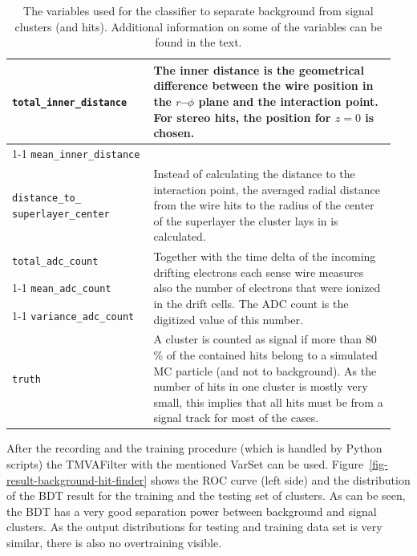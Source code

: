 \begin{table}
\begin{tabular}{p{0.35\linewidth}p{0.60\linewidth}}
   \verb+total_inner_distance+ & \multirow{3}{*}[-1.5pt]{\begin{minipage}{\linewidth} The inner distance is the geometrical difference between the wire position in the $r$--$\phi$ plane and the interaction point. For stereo hits, the position for $z = 0$ is chosen. \end{minipage}} \\[1ex] \cmidrule{1-1}
   \verb+mean_inner_distance+ & \\[1ex] \midrule
   \verb+distance_to_+ \verb+superlayer_center+ & Instead of calculating the distance to the interaction point, the averaged radial distance from the wire hits to the radius of the center of the superlayer the cluster lays in is calculated. \\ \midrule 
   
   \verb+total_adc_count+ & \multirow{3}{*}[-1pt]{\begin{minipage}{\linewidth} Together with the time delta of the incoming drifting electrons each sense wire measures also the number of electrons that were ionized in the drift cells. The ADC count is the digitized value of this number. \end{minipage}} \\ \cmidrule{1-1}
   \verb+mean_adc_count+ & \\ \cmidrule{1-1}
   \verb+variance_adc_count+ & \\ \midrule
   \verb+truth+ & A cluster is counted as signal if more than 80 \% of the contained hits belong to a simulated MC particle (and not to background). As the number of hits in one cluster is mostly very small, this implies that all hits must be from a signal track for most of the cases. \\ \bottomrule
  \end{tabular}

  \caption{The variables used for the classifier to separate background from signal clusters (and hits). Additional information on some of the variables can be found in the text.}
  \label{tab-varset-cluster}
\end{table}

After the recording and the training procedure (which is handled by Python scripts) the TMVAFilter with the mentioned VarSet can be used. Figure~\ref{fig-result-background-hit-finder} shows the ROC curve (left side) and the distribution of the BDT result for the training and the testing set of clusters. As can be seen, the BDT has a very good separation power between background and signal clusters. As the output distributions for testing and training data set is very similar, there is also no overtraining visible.

